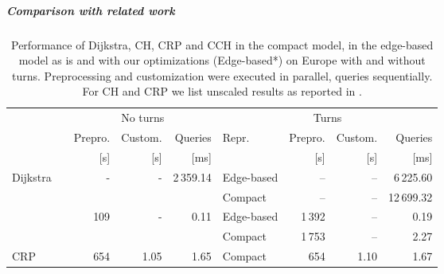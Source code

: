 \documentclass[a4paper, english, cleveref]{lipics-v2021}
\begin{document}
\subparagraph{Comparison with related work}

\begin{table}
\centering
\caption{
Performance of Dijkstra, CH, CRP and CCH in the compact model, in the edge-based model as is and with our optimizations (Edge-based*) on Europe with and without turns.
Preprocessing and customization were executed in parallel, queries sequentially.
For CH and CRP we list unscaled results as reported in \cite{DellingGPW17}.
}\label{tab:related_work_turns}
\begin{tabular}{l@{\hskip4pt}crrrlrrr}
\toprule
{}                        &                                      & \multicolumn{3}{c}{No turns}                                           & \multicolumn{4}{c}{Turns}                  \\
                                                                   \cmidrule(lr){3-5}                                                       \cmidrule(lr){6-9}
{}                        &                                      &             Prepro.  &            Custom. &                    Queries & Repr.      & Prepro. & Custom. &   Queries \\
{}                        &                                      &                 [s]  &                [s] &                       [ms] &            &     [s] &     [s] &      [ms] \\
\midrule
\multirow{2}{*}{Dijkstra} &                                      &   \multirow{2}{*}{-} & \multirow{2}{*}{-} & \multirow{2}{*}{2\,359.14} & Edge-based &      -- &      -- &  6\,225.60 \\
                          &                                      &                      &                    &                            &    Compact &      -- &      -- & 12\,699.32 \\
\addlinespace
\multirow{2}{*}{CH}       & \multirow{2}{*}{\cite{DellingGPW17}} & \multirow{2}{*}{109} & \multirow{2}{*}{-} &      \multirow{2}{*}{0.11} & Edge-based &  1\,392 &      -- &       0.19 \\
                          &                                      &                      &                    &                            &    Compact &  1\,753 &      -- &       2.27 \\
\addlinespace
CRP                       & \cite{DellingGPW17}                  &                  654 &               1.05 &                       1.65 &    Compact &     654 &    1.10 &       1.67 \\

\end{tabular}
\end{table}
\end{document}

